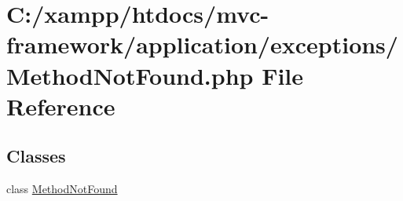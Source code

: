 \hypertarget{_method_not_found_8php}{}\section{C\+:/xampp/htdocs/mvc-\/framework/application/exceptions/\+Method\+Not\+Found.php File Reference}
\label{_method_not_found_8php}
\subsection*{Classes}
\begin{DoxyCompactItemize}
\item 
class \hyperlink{class_method_not_found}{Method\+Not\+Found}
\end{DoxyCompactItemize}
